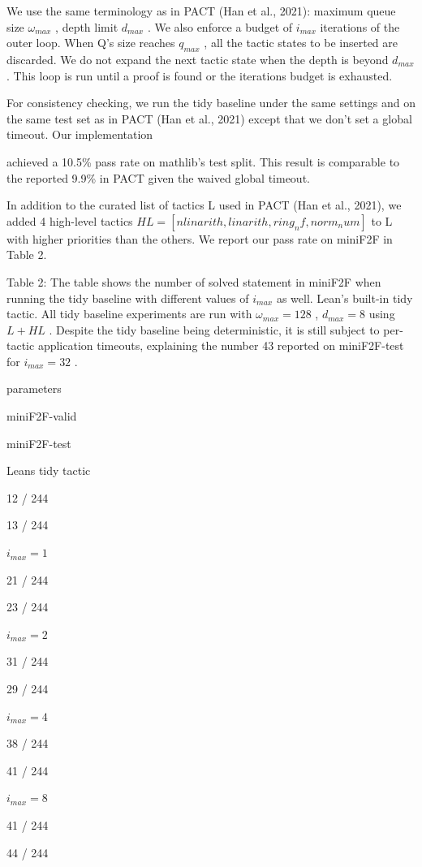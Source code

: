 \documentclass[
]{article}
\begin{document}
We use the same terminology as in PACT (Han et al., 2021): maximum queue
size \(\omega_{max}\) , depth limit \(d_{max}\) . We also enforce a
budget of \(i_{max}\) iterations of the outer loop. When Q's size
reaches \(q_{max}\) , all the tactic states to be inserted are
discarded. We do not expand the next tactic state when the depth is
beyond \(d_{max}\) . This loop is run until a proof is found or the
iterations budget is exhausted.

For consistency checking, we run the tidy baseline under the same
settings and on the same test set as in PACT (Han et al., 2021) except
that we don't set a global timeout. Our implementation

achieved a 10.5\% pass rate on mathlib's test split. This result is
comparable to the reported 9.9\% in PACT given the waived global
timeout.

In addition to the curated list of tactics L used in PACT (Han et al.,
2021), we added 4 high-level tactics
\(HL = [nlinarith, linarith, ring_nf, norm_num]\) to L with higher
priorities than the others. We report our pass rate on miniF2F in Table
2.

Table 2: The table shows the number of solved statement in miniF2F when
running the tidy baseline with different values of \(i_{max}\) as well.
Lean's built-in tidy tactic. All tidy baseline experiments are run with
\(\omega_{max} = 128\) , \(d_{max} = 8\) using \(L + HL\) . Despite the
tidy baseline being deterministic, it is still subject to per-tactic
application timeouts, explaining the number 43 reported on miniF2F-test
for \(i_{max} = 32\) .

parameters

miniF2F-valid

miniF2F-test

Lean\textquotesingle s tidy tactic

12 / 244

13 / 244

\(i_{max} = 1\)

21 / 244

23 / 244

\(i_{max} = 2\)

31 / 244

29 / 244

\(i_{max} = 4\)

38 / 244

41 / 244

\(i_{max} = 8\)

41 / 244

44 / 244
\end{document}
